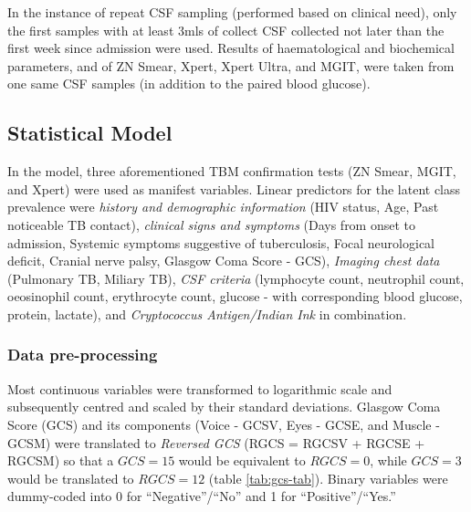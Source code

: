 \documentclass[
]{article}
\begin{document}
In the instance of repeat CSF sampling (performed based on clinical need), only the first samples with at least 3mls of collect CSF collected not later than the first week since admission were used. Results of haematological and biochemical parameters, and of ZN Smear, Xpert, Xpert Ultra, and MGIT, were taken from one same CSF samples (in addition to the paired blood glucose).

\hypertarget{statistical-model}{%
\subsection{Statistical Model}\label{statistical-model}}

In the model, three aforementioned TBM confirmation tests (ZN Smear, MGIT, and Xpert) were used as manifest variables. Linear predictors for the latent class prevalence were \emph{history and demographic information} (HIV status, Age, Past noticeable TB contact), \emph{clinical signs and symptoms} (Days from onset to admission, Systemic symptoms suggestive of tuberculosis, Focal neurological deficit, Cranial nerve palsy, Glasgow Coma Score - GCS), \emph{Imaging chest data} (Pulmonary TB, Miliary TB), \emph{CSF criteria} (lymphocyte count, neutrophil count, oeosinophil count, erythrocyte count, glucose - with corresponding blood glucose, protein, lactate), and \emph{Cryptococcus Antigen/Indian Ink} in combination.

\hypertarget{data-pre-processing}{%
\subsubsection{Data pre-processing}\label{data-pre-processing}}

Most continuous variables were transformed to logarithmic scale and subsequently centred and scaled by their standard deviations. Glasgow Coma Score (GCS) and its components (Voice - GCSV, Eyes - GCSE, and Muscle - GCSM) were translated to \emph{Reversed GCS} (RGCS = RGCSV + RGCSE + RGCSM) so that a \(GCS = 15\) would be equivalent to \(RGCS = 0\), while \(GCS = 3\) would be translated to \(RGCS = 12\) (table \ref{tab:gcs-tab}). Binary variables were dummy-coded into 0 for ``Negative''/``No'' and 1 for ``Positive''/``Yes.''

\providecommand{\docline}[3]{\noalign{\global\setlength{\arrayrulewidth}{#1}}\arrayrulecolor[HTML]{#2}\cline{#3}}

\setlength{\tabcolsep}{2pt}

\renewcommand*{\arraystretch}{1.5}
\end{document}
